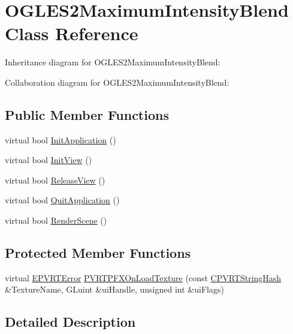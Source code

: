 \hypertarget{class_o_g_l_e_s2_maximum_intensity_blend}{\section{O\+G\+L\+E\+S2\+Maximum\+Intensity\+Blend Class Reference}
\label{class_o_g_l_e_s2_maximum_intensity_blend}
}


Inheritance diagram for O\+G\+L\+E\+S2\+Maximum\+Intensity\+Blend\+:


Collaboration diagram for O\+G\+L\+E\+S2\+Maximum\+Intensity\+Blend\+:
\subsection*{Public Member Functions}
\begin{DoxyCompactItemize}
\item 
virtual bool \hyperlink{class_o_g_l_e_s2_maximum_intensity_blend_a9f1761c6c3cec29f071e1dd73d740a40}{Init\+Application} ()
\item 
virtual bool \hyperlink{class_o_g_l_e_s2_maximum_intensity_blend_ab3bb87b3ff371c02101474f097b2db19}{Init\+View} ()
\item 
virtual bool \hyperlink{class_o_g_l_e_s2_maximum_intensity_blend_a5680e3b53e14a1b07e2ba0b1446e854a}{Release\+View} ()
\item 
virtual bool \hyperlink{class_o_g_l_e_s2_maximum_intensity_blend_a322568dde9e8682fb3a1edd2cec2c6bf}{Quit\+Application} ()
\item 
virtual bool \hyperlink{class_o_g_l_e_s2_maximum_intensity_blend_af3a7ec554818b805290fef1a04036d2f}{Render\+Scene} ()
\end{DoxyCompactItemize}
\subsection*{Protected Member Functions}
\begin{DoxyCompactItemize}
\item 
virtual \hyperlink{_p_v_r_t_error_8h_a9e837ff1a83f3a5f332bc4cc78454608}{E\+P\+V\+R\+T\+Error} \hyperlink{class_o_g_l_e_s2_maximum_intensity_blend_a3477b27466041945ac77e639ca40182c}{P\+V\+R\+T\+P\+F\+X\+On\+Load\+Texture} (const \hyperlink{class_c_p_v_r_t_string_hash}{C\+P\+V\+R\+T\+String\+Hash} \&Texture\+Name, G\+Luint \&ui\+Handle, unsigned int \&ui\+Flags)
\end{DoxyCompactItemize}


\subsection{Detailed Description}


